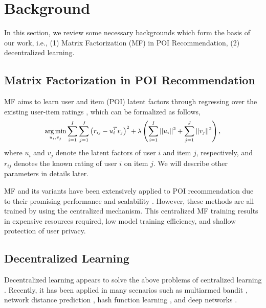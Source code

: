 \section{Background}\label{background}
In this section, we review some necessary backgrounds which form the basis of our work, i.e., (1) Matrix Factorization (MF) in POI Recommendation, (2) decentralized learning.

\subsection{Matrix Factorization in POI Recommendation}

MF aims to learn user and item (POI) latent factors through regressing over the existing user-item ratings \cite{koren2009matrix,mnih2007probabilistic}, which can be formalized as follows,
\begin{equation}\small
\label{lfm}
\begin{split}
\mathop {\arg \min }\limits_{u_i,v_j} \sum\limits_{i=1}^{I} \sum\limits_{j=1}^{J} {{\left( {r_{ij} - u_i^T{v_j}} \right)}^2}  + \lambda\left(\sum\limits_{i=1}^{I} {||{u_i}||^2}  + \sum\limits_{j=1}^{J} {||{v_j}||^2}\right),
\end{split}	
\end{equation}
where $u_i$ and $v_j$ denote the latent factors of user $i$ and item $j$, respectively, and $r_{ij}$ denotes the known rating of user $i$ on item $j$. We will describe other parameters in details later. 

MF and its variants have been extensively applied to POI recommendation due to their promising performance and scalability \cite{cheng2011exploring,cheng2012fused,yang2013sentiment}. 
However, these methods are all trained by using the centralized mechanism. 
This centralized MF training results in expensive resources required, low model training efficiency, and shallow protection of user privacy. 


\subsection{Decentralized Learning}
Decentralized learning appears to solve the above problems of centralized learning 
\cite{nedic2009distributed,yan2013distributed}. 
Recently, it has been applied in many scenarios such as multiarmed bandit \cite{kalathil2014decentralized}, network distance prediction \cite{liao2010network}, hash function learning \cite{leng2015hashing}, and deep networks \cite{shokri2015privacy,mcmahan2016communication}. 

